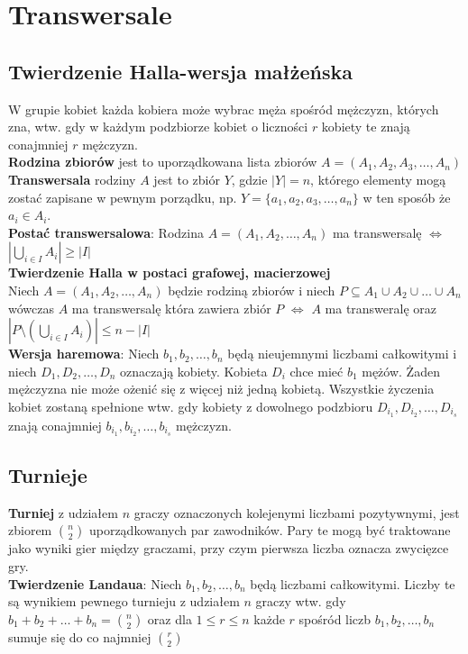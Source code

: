 \documentclass[a4paper,12pt]{article}
\begin{document}
\section{Transwersale}
\subsection{Twierdzenie Halla-wersja małżeńska}W grupie kobiet każda kobiera może wybrac męża spośród mężczyzn, których zna, wtw. gdy w każdym podzbiorze kobiet o liczności $r$ kobiety te znają conajmniej $r$ mężczyzn.\\
\textbf{Rodzina zbiorów} jest to uporządkowana lista zbiorów $A=(A_1,A_2,A_3,\hdots,A_n)$\\
\textbf{Transwersala} rodziny $A$ jest to zbiór $Y$, gdzie $|Y|=n$, którego elementy mogą zostać zapisane w pewnym porządku, np. $Y=\{ a_1, a_2, a_3,\hdots, a_n\}$ w ten sposób że $a_i\in A_i$.\\
\textbf{Postać transwersalowa}: Rodzina $A=(A_1, A_2, \dots, A_n)$ ma transwersalę $\Leftrightarrow$ $\left| \bigcup\limits_{i\in I}A_i\right|\geq |I|$\\
\textbf{Twierdzenie Halla w postaci grafowej, macierzowej}\\
Niech $A=(A_1, A_2, \dots, A_n)$ będzie rodziną zbiorów i niech $P\subseteq A_1 \cup A_2\cup \dots \cup A_n$ wówczas $A$ ma transwersalę która zawiera zbiór $P$ $\Leftrightarrow$ $A$ ma transweralę oraz $\left| P \setminus \left(\bigcup\limits_{i\in I}A_i\right)\right|\leq n-|I|$\\
\textbf{Wersja haremowa}: Niech $b_1, b_2, \dots , b_n$ będą nieujemnymi liczbami całkowitymi i niech $D_1, D_2, \dots, D_n$ oznaczają kobiety. Kobieta $D_i$ chce mieć $b_1$ mężów. Żaden mężczyzna nie może ożenić się z więcej niż jedną kobietą. Wszystkie życzenia kobiet zostaną spełnione wtw. gdy kobiety z dowolnego podzbioru $D_{i_1}, D_{i_2}, \dots, D_{i_s}$ znają conajmniej $b_{i_1}, b_{i_2}, \dots, b_{i_s}$ mężczyzn.
\subsection{Turnieje}
\textbf{Turniej} z udziałem $n$ graczy oznaczonych kolejenymi liczbami pozytywnymi, jest zbiorem $n\choose2$ uporządkowanych par zawodników. Pary te mogą być traktowane jako wyniki gier między graczami, przy czym pierwsza liczba oznacza zwycięzce gry.\\
\textbf{Twierdzenie Landaua}: Niech $b_1, b_2,\hdots,b_n$ będą liczbami całkowitymi. Liczby te są wynikiem pewnego turnieju z udziałem $n$ graczy wtw. gdy $b_1+b_2+\hdots+b_n={n\choose2}$ oraz dla $1\leq r \leq n$ każde $r$ spośród liczb $b_1, b_2,\hdots,b_n$ sumuje się do co najmniej $r\choose2$
\end{document}
